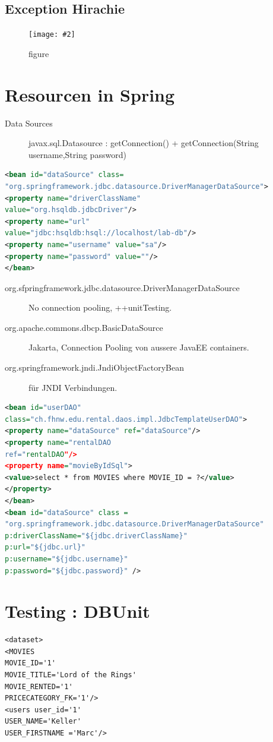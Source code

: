 \documentclass[a4paper,10pt]{scrreprt}
\newcommand{\pic}[2][figure]{\begin{figure}[h]
 \centering
 \texttt{[image: \#2]}
 \caption{#1}
\end{figure}
}
\begin{document}
\subsection{Exception Hirachie}
\pic{exheirachie.png}

\section{Resourcen in Spring}
\begin{description}
 \item [Data Sources] javax.sql.Datasource : getConnection() + getConnection(String username,String password)
\end{description}
\begin{lstlisting}[caption=Sample JDBC Declaration von DataSource,language=xml]
 <bean id="dataSource" class=
"org.springframework.jdbc.datasource.DriverManagerDataSource">
<property name="driverClassName"
value="org.hsqldb.jdbcDriver"/>
<property name="url"
value="jdbc:hsqldb:hsql://localhost/lab-db"/>
<property name="username" value="sa"/>
<property name="password" value=""/>
</bean>
\end{lstlisting}

\begin{description}
 \item [org.sfpringframework.jdbc.datasource.DriverManagerDataSource] No connection pooling, ++unitTesting.
 \item [org.apache.commons.dbcp.BasicDataSource] Jakarta, Connection Pooling von aussere JavaEE containers.
 \item [org.springframework.jndi.JndiObjectFactoryBean] für JNDI Verbindungen.
\end{description}

\begin{lstlisting}[caption=Bean Resources JDBC,language=xml]
 <bean id="userDAO"
class="ch.fhnw.edu.rental.daos.impl.JdbcTemplateUserDAO">
<property name="dataSource" ref="dataSource"/>
<property name="rentalDAO
ref="rentalDAO"/>
<property name="movieByIdSql">
<value>select * from MOVIES where MOVIE_ID = ?</value>
</property>
</bean>
<bean id="dataSource" class =
"org.springframework.jdbc.datasource.DriverManagerDataSource"
p:driverClassName="${jdbc.driverClassName}"
p:url="${jdbc.url}"
p:username="${jdbc.username}"
p:password="${jdbc.password}" />
\end{lstlisting}

\section{Testing : DBUnit}
\begin{lstlisting}[caption=DBUnit Test Data]
 <dataset>
<MOVIES
MOVIE_ID='1'
MOVIE_TITLE='Lord of the Rings'
MOVIE_RENTED='1'
PRICECATEGORY_FK='1'/>
<users user_id='1'
USER_NAME='Keller'
USER_FIRSTNAME ='Marc'/>
\end{lstlisting}
\end{document}
